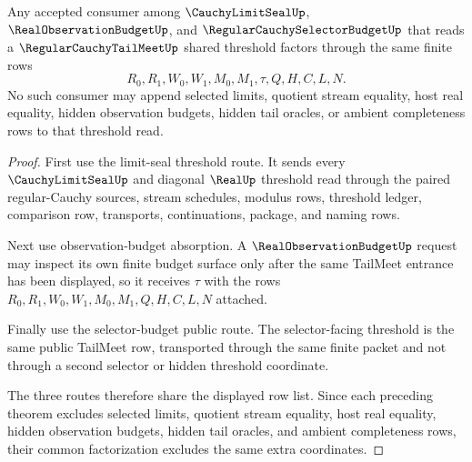 \begin{theorem}
\label{thm:regular-cauchy-tail-meet-consumer-route-triple-factorization}
\label{thm:regular-cauchy-tail-meet-triple-consumer-route-factorization}
Any accepted consumer among $\CauchyLimitSealUp$, $\RealObservationBudgetUp$, and $\RegularCauchySelectorBudgetUp$ that reads a $\RegularCauchyTailMeetUp$ shared threshold factors through the same finite rows
$$
R_0,R_1,W_0,W_1,M_0,M_1,\tau,Q,H,C,L,N .
$$
No such consumer may append selected limits, quotient stream equality, host real equality, hidden observation budgets, hidden tail oracles, or ambient completeness rows to that threshold read.
\end{theorem}
\begin{proof}
First use the limit-seal threshold route. It sends every $\CauchyLimitSealUp$ and diagonal $\RealUp$ threshold read through the paired regular-Cauchy sources, stream schedules, modulus rows, threshold ledger, comparison row, transports, continuations, package, and naming rows.

Next use observation-budget absorption. A $\RealObservationBudgetUp$ request may inspect its own finite budget surface only after the same TailMeet entrance has been displayed, so it receives $\tau$ with the rows $R_0,R_1,W_0,W_1,M_0,M_1,Q,H,C,L,N$ attached.

Finally use the selector-budget public route. The selector-facing threshold is the same public TailMeet row, transported through the same finite packet and not through a second selector or hidden threshold coordinate.

The three routes therefore share the displayed row list. Since each preceding theorem excludes selected limits, quotient stream equality, host real equality, hidden observation budgets, hidden tail oracles, and ambient completeness rows, their common factorization excludes the same extra coordinates.
\end{proof}

